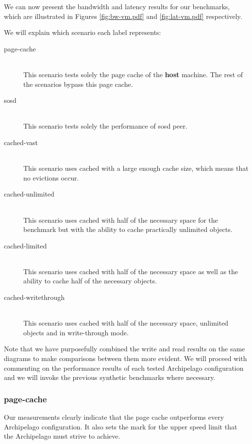 We can now present the bandwidth and latency results for our benchmarks, which 
are illustrated in Figures \ref{fig:bw-vm.pdf} and \ref{fig:lat-vm.pdf} 
respectively. 



We will explain which scenario each label represents:

\begin{description}
	\item[page-cache] \hfill \\
		This scenario tests solely the page cache of the \textbf{host} machine.  
		The rest of the scenarios bypass this page cache.
	\item[sosd] \hfill \\
		This scenario tests solely the performance of sosd peer.
	\item[cached-vast] \hfill \\
		This scenario uses cached with a large enough cache size, which means 
		that no evictions occur.
	\item[cached-unlimited] \hfill \\
		This scenario uses cached with half of the necessary space for 
		the benchmark but with the ability to cache practically 
		unlimited objects.
	\item[cached-limited] \hfill \\
		This scenario uses cached with half of the necessary space as 
		well as the ability to cache half of the necessary objects.
	\item[cached-writethrough] \hfill \\
		This scenario uses cached with half of the necessary space, 
		unlimited objects and in write-through mode.
\end{description}

		
Note that we have purposefully combined the write and read results on the same 
diagrams to make comparisons between them more evident. We will proceed with 
commenting on the performance results of each tested Archipelago configuration 
and we will invoke the previous synthetic benchmarks where necessary.

\subsubsection{page-cache}

Our measurements clearly indicate that the page cache outperforms every 
Archipelago configuration. It also sets the mark for the upper speed limit that 
the Archipelago must strive to achieve.

